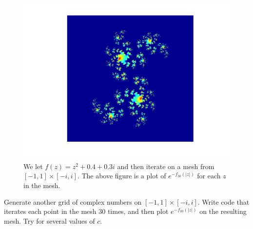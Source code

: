 \begin{figure}\label{Fig:julia}
\begin{center}
\includegraphics[scale=0.5]{julia}
\caption{We let $f(z) = z^2 + 0.4 + 0.3i$ and then iterate on a mesh from $[-1,1]\times[-i,i]$.  The above figure is a plot of $e^{-f_{30}(|z|)}$ for each $z$ in the mesh.}
\end{center}
\end{figure}


\begin{problem}
Generate another grid of complex numbers on $[-1,1]\times[-i,i]$.  Write code that iterates each point in the mesh 30 times, and then plot $e^{-f_{30}(|z|)}$ on the resulting mesh.  Try for several values of $c$.
\end{problem}




